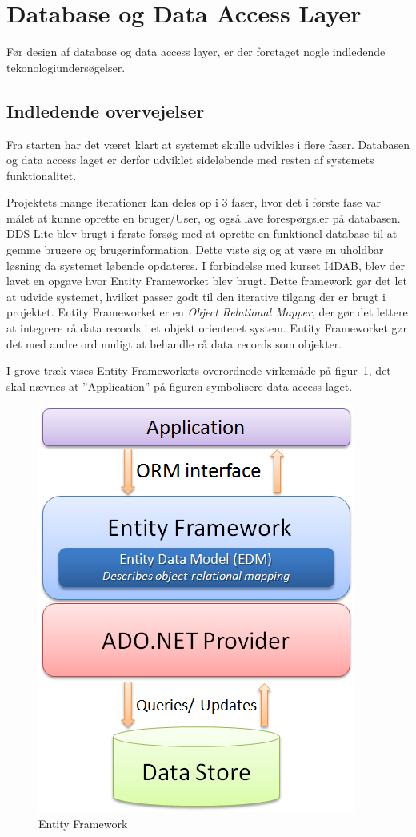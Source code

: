 \section{Database og Data Access Layer}\label{sec:designdatabase}

Før design af database og data access layer, er der foretaget nogle indledende tekonologiundersøgelser.

\subsection{Indledende overvejelser}
Fra starten har det været klart at systemet skulle udvikles i flere faser. Databasen og data access laget er derfor udviklet sideløbende med resten af systemets funktionalitet.

Projektets mange iterationer kan deles op i 3 faser, hvor det i første fase var målet at kunne oprette en bruger/User, og også lave forespørgsler på databasen.
DDS-Lite blev brugt i første forsøg med at oprette en funktionel database til at gemme brugere og brugerinformation. Dette viste sig og at være en uholdbar løsning da systemet løbende opdateres. I forbindelse med kurset I4DAB, blev der lavet en opgave hvor Entity Frameworket blev brugt. Dette framework gør det let at udvide systemet, hvilket passer godt til den iterative tilgang der er brugt i projektet. Entity Frameworket er en \textit{Object Relational Mapper}, der gør det lettere at integrere rå data records i et objekt orienteret system. Entity Frameworket gør det med andre ord muligt at behandle rå data records som objekter.

I grove træk vises Entity Frameworkets overordnede virkemåde på figur~\ref{fig:EFarch}, det skal nævnes at ''Application'' på figuren symbolisere data access laget.

\begin{figure}[h]
\centering
\includegraphics[width=0.5\linewidth]{figs/dbExtra/EFarch}
\caption{Entity Framework \cite{efArch}}
\label{fig:EFarch}
\end{figure}


